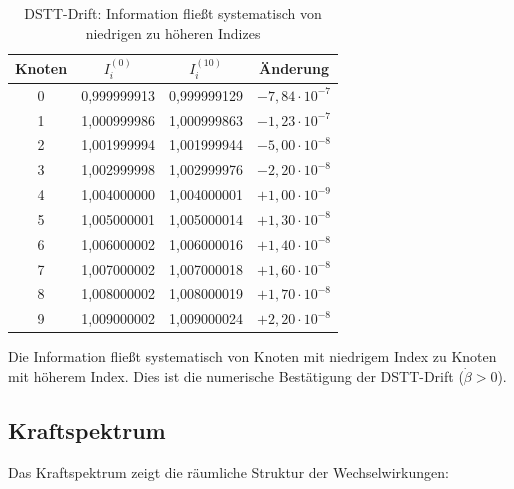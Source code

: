 \documentclass[12pt,a4paper]{article}
\begin{document}
\begin{table}[H]
\centering
\begin{tabular}{c|c|c|c}
Knoten & $I_i^{(0)}$ & $I_i^{(10)}$ & Änderung \\
\hline
0 & 0,999999913 & 0,999999129 & $-7,84\cdot 10^{-7}$ \\
1 & 1,000999986 & 1,000999863 & $-1,23\cdot 10^{-7}$ \\
2 & 1,001999994 & 1,001999944 & $-5,00\cdot 10^{-8}$ \\
3 & 1,002999998 & 1,002999976 & $-2,20\cdot 10^{-8}$ \\
4 & 1,004000000 & 1,004000001 & $+1,00\cdot 10^{-9}$ \\
5 & 1,005000001 & 1,005000014 & $+1,30\cdot 10^{-8}$ \\
6 & 1,006000002 & 1,006000016 & $+1,40\cdot 10^{-8}$ \\
7 & 1,007000002 & 1,007000018 & $+1,60\cdot 10^{-8}$ \\
8 & 1,008000002 & 1,008000019 & $+1,70\cdot 10^{-8}$ \\
9 & 1,009000002 & 1,009000024 & $+2,20\cdot 10^{-8}$ \\
\end{tabular}
\caption{DSTT-Drift: Information fließt systematisch von niedrigen zu höheren Indizes}
\label{tab:drift}
\end{table}

Die Information fließt systematisch von Knoten mit niedrigem Index zu Knoten mit höherem Index. Dies ist die numerische Bestätigung der DSTT-Drift ($\dot{\beta} > 0$).

\subsection{Kraftspektrum}

Das Kraftspektrum zeigt die räumliche Struktur der Wechselwirkungen:
\end{document}
